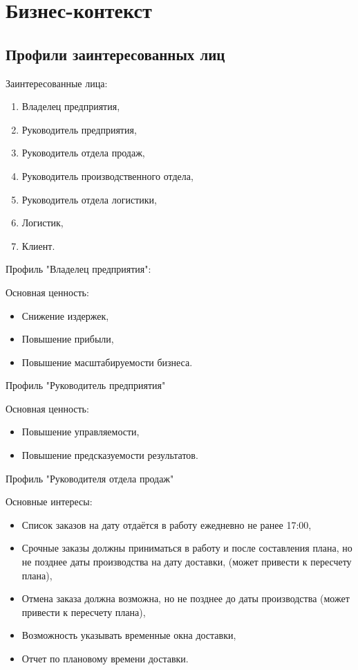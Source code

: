 \chapter{Бизнес-контекст}
\label{ch:chap4}


\section{Профили заинтересованных лиц}
\label{sec:stakeholders}

Заинтересованные лица:
\begin{enumerate}[label=\arabic*]
    \item Владелец предприятия,
    \item Руководитель предприятия,
    \item Руководитель отдела продаж,
    \item Руководитель производственного отдела,
    \item Руководитель отдела логистики,
    \item Логистик,
    \item Клиент.
\end{enumerate}

Профиль "Владелец предприятия":

Основная ценность:
\begin{itemize}
    \item Снижение издержек,
    \item Повышение прибыли,
    \item Повышение масштабируемости бизнеса.
\end{itemize}

Профиль "Руководитель предприятия"

Основная ценность:
\begin{itemize}
    \item Повышение управляемости,
    \item Повышение предсказуемости результатов.
\end{itemize}

Профиль "Руководителя отдела продаж"

Основные интересы:
\begin{itemize}
    \item Список заказов на дату отдаётся в работу ежедневно не ранее 17:00,
    \item Срочные заказы должны приниматься в работу и после составления плана, но не позднее даты производства на дату доставки, (может привести к пересчету плана),
    \item Отмена заказа должна возможна, но не позднее до даты производства (может привести к пересчету плана),
    \item Возможность указывать временные окна доставки,
    \item Отчет по плановому времени доставки.
\end{itemize}

